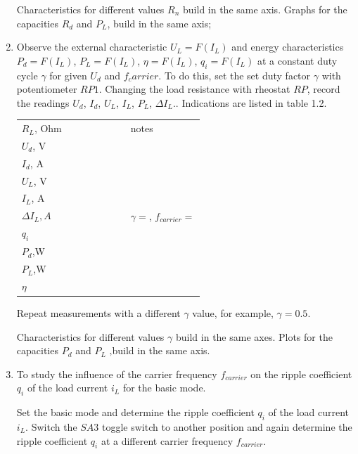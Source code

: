 \documentclass[a4paper,14pt]{article}
\begin{document}
\begin{enumerate}
Characteristics for different values $R_n$ build in the same axis.
Graphs for the capacities $R_d$ and $P_L$, build in the same axis;

\item
	Observe the external characteristic $U_L =F(I_L)$ and energy characteristics $P_d=F(I_L)$, $P_L=F(I_L)$, $\eta= F(I_L)$, $q_i = F (I_L)$ at a constant duty cycle 
	$\gamma$ for given $U_d$ and $f_carrier$.
To do this, set the set duty factor $\gamma$ with potentiometer $RP1$.
Changing the load resistance with rheostat $RP$, record the readings $U_d$, $I_d$, $U_L$, $I_L$, $P_L$, ${\scriptstyle \Delta}I_L$..
Indications are listed in table 1.2.

\begin{tabular}{l|p{10pt}|p{10pt}|p{10pt}|p{10pt}|p{10pt}|p{10pt}|p{100pt}}
        $R_L$, Ohm & &&&&&& notes\\
        \cmidrule{1-8}
	$U_d$, V &&&&&&&\multirow{9}{*}{\begin{minipage}{0.3\textwidth}$\gamma=$, $f_{carrier}=$ \end{minipage}}\\
        \cmidrule{1-7}
        $I_d$, A &&&&&&\\
        \cmidrule{1-7}
$U_L$, V &&&&&&\\
        \cmidrule{1-7}
        $I_L$, A &&&&&&\\
        \cmidrule{1-7}
        ${\scriptstyle \Delta}I_L,A$&&&&&&\\
        \cmidrule{1-7}
$q_i$ &&&&&&\\
        \cmidrule{1-7}
$P_d$,W &&&&&&\\
        \cmidrule{1-7}
$P_L$,W &&&&&&\\
        \cmidrule{1-7}
$\eta$&&&&&&\\
\end{tabular}


Repeat measurements with a different $\gamma$ value, for example, $\gamma=0.5$.

Characteristics for different values $\gamma$ build in the same axes.
Plots for the capacities $P_d$ and $P_L$ ‚build in the same axis.

\item
	To study the influence of the carrier frequency $f_{carrier}$ on the ripple coefficient $q_i$ of the load current $i_L$ for the basic mode.

Set the basic mode and determine the ripple coefficient $q_i$ of the load current $i_L$.
Switch the $SA3$ toggle switch to another position and again determine the ripple coefficient $q_i$ at a different carrier frequency $f_{carrier}$.


\end{enumerate}
\end{document}
